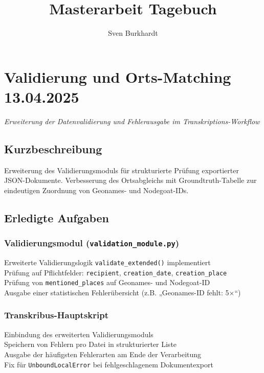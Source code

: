 \documentclass{article}
\title{\Huge Masterarbeit Tagebuch}
\author{Sven Burkhardt}
\date{}
\begin{document}
\maketitle
\noindent
\hrulefill

\newpage %
\tableofcontents


\noindent\hrulefill

\section{Validierung und Orts-Matching \small 13.04.2025}
\small\textit{Erweiterung der Datenvalidierung und Fehlerausgabe im Transkriptions-Workflow}\\

\subsection*{Kurzbeschreibung}

Erweiterung des Validierungsmoduls für strukturierte Prüfung exportierter JSON-Dokumente. Verbesserung des Ortsabgleichs mit Groundtruth-Tabelle zur eindeutigen Zuordnung von Geonames- und Nodegoat-IDs.

\subsection*{Erledigte Aufgaben}
\subsubsection*{\small Validierungsmodul (\texttt{validation\_module.py})}
 Erweiterte Validierungslogik \texttt{validate\_extended()} implementiert\\
 Prüfung auf Pflichtfelder: \texttt{recipient}, \texttt{creation\_date}, \texttt{creation\_place}\\
 Prüfung von \texttt{mentioned\_places} auf Geonames- und Nodegoat-ID\\
 Ausgabe einer statistischen Fehlerübersicht (z.B. „Geonames-ID fehlt: 5×“)

\subsubsection*{\small Transkribus-Hauptskript}
 Einbindung des erweiterten Validierungsmoduls\\
 Speichern von Fehlern pro Datei in strukturierter Liste\\
 Ausgabe der häufigsten Fehlerarten am Ende der Verarbeitung\\
 Fix für \texttt{UnboundLocalError} bei fehlgeschlagenem Dokumentexport
\end{document}
